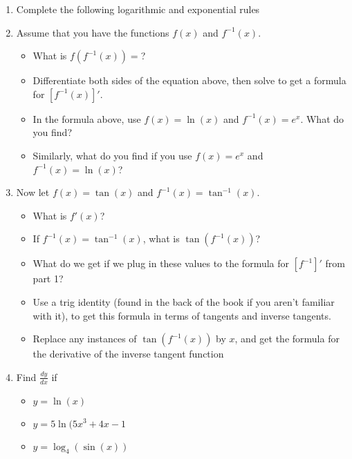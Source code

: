 \documentclass{article}
\begin{document}
\begin{enumerate}
\item Complete the following logarithmic and exponential rules
\begin{itemize}
    \item $x^ax^b=$?
    \item $(x^a)^b=$?
    \item $\frac{x^a}{x^b}$=?
    \item $\ln(ab) = $?
    \item $\ln{\frac{a}{b}}$=?
    \ite $\ln(x^a}$=?
\end{itemize}
    \item Assume that you have the functions $f(x)$ and $f^{-1}(x)$.
    \begin{itemize}
        \item What is $f(f^{-1}(x)) = $?
        \item Differentiate both sides of the equation above, then solve to get a formula for $[f^{-1}(x)]'$.
        \item In the formula above, use $f(x) = \ln(x)$ and $f^{-1}(x) = e^x$. What do you find?
        \item Similarly, what do you find if you use $f(x) = e^x$ and $f^{-1}(x) = \ln(x)$?
    \end{itemize}
    \item Now let $f(x) = \tan(x)$ and $f^{-1}(x) = \tan^{-1}(x)$.
    \begin{itemize}
        \item What is $f'(x)$?
        \item If $f^{-1}(x) = \tan^{-1}(x)$, what is $\tan(f^{-1}(x))$?
        \item What do we get if we plug in these values to the formula for $[f^{-1}]'$ from part 1?
        \item Use a trig identity (found in the back of the book if you aren't familiar with it), to get this formula in terms of tangents and inverse tangents. 
        \item Replace any instances of $\tan(f^{-1}(x))$ by $x$, and get the formula for the derivative of the inverse tangent function
    \end{itemize}
    \item Find $\frac{dy}{dx}$ if 
    \begin{itemize}
        \item $y = \ln(x)$
        \item $y = 5\ln(5x^3 + 4x -1$
        \item $y = \log_4(\sin(x))$

\end{itemize}
\end{enumerate}
\end{document}

